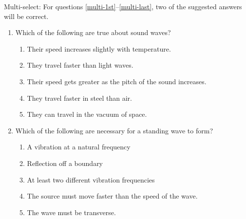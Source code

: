 \documentclass{../../../oss-apphys}
\begin{document}
\begin{multicols}{2}
\begin{enumerate}[leftmargin=18pt,resume]
    

  \end{enumerate}
    
  Multi-select: For questions \ref{multi-1st}--\ref{multi-last}, two of the
  suggested answers will be correct.
  \begin{enumerate}[leftmargin=18pt,resume]
    
  \item Which of the following are true about sound waves?
    \label{multi-1st}
    \begin{enumerate}[noitemsep,topsep=0pt,leftmargin=18pt,label=(\Alph*)]
    \item Their speed increases slightly with temperature.
    \item They travel faster than light waves.
    \item Their speed gets greater as the pitch of the sound increases.
    \item They travel faster in steel than air.
    \item They can travel in the vacuum of space.
    \end{enumerate}
    
  \item Which of the following are necessary for a standing wave to form?
    \begin{enumerate}[noitemsep,topsep=0pt,leftmargin=18pt,label=(\Alph*)]
    \item A vibration at a natural frequency
    \item Reflection off a boundary
    \item At least two different vibration frequencies
    \item The source must move faster than the speed of the wave.
    \item The wave must be transverse.
    \end{enumerate}


\end{enumerate}
\end{multicols}
\end{document}
